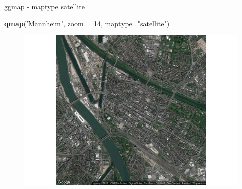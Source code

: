 \documentclass[ignorenonframetext,]{beamer}
\newenvironment{Shaded}{}{}
\newcommand{\KeywordTok}[1]{\textcolor[rgb]{0.00,0.44,0.13}{\textbf{{#1}}}}
\newcommand{\DataTypeTok}[1]{\textcolor[rgb]{0.56,0.13,0.00}{{#1}}}
\newcommand{\DecValTok}[1]{\textcolor[rgb]{0.25,0.63,0.44}{{#1}}}
\newcommand{\StringTok}[1]{\textcolor[rgb]{0.25,0.44,0.63}{{#1}}}
\newcommand{\NormalTok}[1]{{#1}}
\begin{document}
\begin{frame}[fragile]{ggmap - maptype satellite}

\begin{Shaded}
\begin{Highlighting}[]
\KeywordTok{qmap}\NormalTok{(}\StringTok{'Mannheim'}\NormalTok{, }\DataTypeTok{zoom =} \DecValTok{14}\NormalTok{, }\DataTypeTok{maptype=}\StringTok{"satellite"}\NormalTok{)}
\end{Highlighting}
\end{Shaded}

\begin{figure}[htbp]
\centering
\includegraphics{RSocialScience2_files/figure-beamer/unnamed-chunk-37-1.pdf}
\caption{}
\end{figure}

\end{frame}
\end{document}
